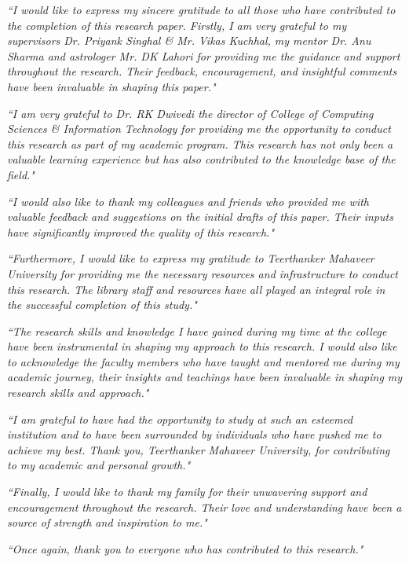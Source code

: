 \textit{``I would like to express my sincere gratitude to all those who have contributed to the completion of this research paper. Firstly, I am very grateful to my supervisors Dr. Priyank Singhal \& Mr. Vikas Kuchhal, my mentor Dr. Anu Sharma and astrologer Mr. DK Lahori for providing me the guidance and support throughout the research. Their feedback, encouragement, and insightful comments have been invaluable in shaping this paper."}

\textit{``I am very grateful to Dr. RK Dwivedi the director of College of Computing Sciences \& Information Technology for providing me the opportunity to conduct this research as part of my academic program. This research has not only been a valuable learning experience but has also contributed to the knowledge base of the field."}

\textit{``I would also like to thank my colleagues and friends who provided me with valuable feedback and suggestions on the initial drafts of this paper. Their inputs have significantly improved the quality of this research."}

\textit{``Furthermore, I would like to express my gratitude to Teerthanker Mahaveer University for providing me the necessary resources and infrastructure to conduct this research. The library staff and resources have all played an integral role in the successful completion of this study."}

\textit{``The research skills and knowledge I have gained during my time at the college have been instrumental in shaping my approach to this research. I would also like to acknowledge the faculty members who have taught and mentored me during my academic journey, their insights and teachings have been invaluable in shaping my research skills and approach."}

\textit{``I am grateful to have had the opportunity to study at such an esteemed institution and to have been surrounded by individuals who have pushed me to achieve my best. Thank you, Teerthanker Mahaveer University, for contributing to my academic and personal growth."}

\textit{``Finally, I would like to thank my family for their unwavering support and encouragement throughout the research. Their love and understanding have been a source of strength and inspiration to me."}

\textit{``Once again, thank you to everyone who has contributed to this research."}